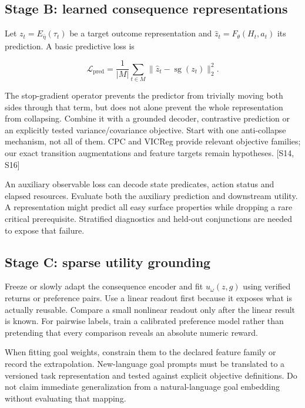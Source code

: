 \documentclass[
  11pt,
  a4paper,
]{article}
\begin{document}
\subsection{Stage B: learned consequence
representations}\label{stage-b-learned-consequence-representations}

Let \(z_t=E_{\bar\eta}(\tau_t)\) be a target outcome representation and
\(\hat z_t=F_\theta(H_t,a_t)\) its prediction. A basic predictive loss
is

\[
\mathcal L_{\mathrm{pred}}=\frac{1}{|M|}\sum_{t\in M}\|\hat z_t-\operatorname{sg}(z_t)\|_2^2.
\]

The stop-gradient operator prevents the predictor from trivially moving
both sides through that term, but does not alone prevent the whole
representation from collapsing. Combine it with a grounded decoder,
contrastive prediction or an explicitly tested variance/covariance
objective. Start with one anti-collapse mechanism, not all of them. CPC
and VICReg provide relevant objective families; our exact transition
augmentations and feature targets remain hypotheses. {[}S14, S16{]}

An auxiliary observable loss can decode state predicates, action status
and elapsed resources. Evaluate both the auxiliary prediction and
downstream utility. A representation might predict all easy surface
properties while dropping a rare critical prerequisite. Stratified
diagnostics and held-out conjunctions are needed to expose that failure.

\subsection{Stage C: sparse utility
grounding}\label{stage-c-sparse-utility-grounding}

Freeze or slowly adapt the consequence encoder and fit \(u_\omega(z,g)\)
using verified returns or preference pairs. Use a linear readout first
because it exposes what is actually reusable. Compare a small nonlinear
readout only after the linear result is known. For pairwise labels,
train a calibrated preference model rather than pretending that every
comparison reveals an absolute numeric reward.

When fitting goal weights, constrain them to the declared feature family
or record the extrapolation. New-language goal prompts must be
translated to a versioned task representation and tested against
explicit objective definitions. Do not claim immediate generalization
from a natural-language goal embedding without evaluating that mapping.
\end{document}
